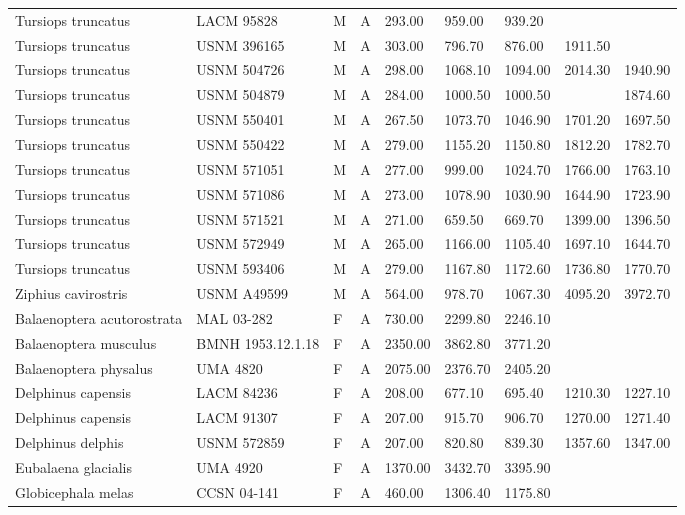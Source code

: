 \begin{longtable}{|p{1in}p{.8in}p{.25in}p{.25in}p{.5in}p{.5in}p{.5in}p{.5in}p{.55in}|}
  Tursiops truncatus & LACM 95828 & M & A & 293.00 & 959.00 & 939.20 &  &  \\ 
  Tursiops truncatus & USNM 396165 & M & A & 303.00 & 796.70 & 876.00 & 1911.50 &  \\ 
  Tursiops truncatus & USNM 504726 & M & A & 298.00 & 1068.10 & 1094.00 & 2014.30 & 1940.90 \\ 
  Tursiops truncatus & USNM 504879 & M & A & 284.00 & 1000.50 & 1000.50 &  & 1874.60 \\ 
  Tursiops truncatus & USNM 550401 & M & A & 267.50 & 1073.70 & 1046.90 & 1701.20 & 1697.50 \\ 
  Tursiops truncatus & USNM 550422 & M & A & 279.00 & 1155.20 & 1150.80 & 1812.20 & 1782.70 \\ 
  Tursiops truncatus & USNM 571051 & M & A & 277.00 & 999.00 & 1024.70 & 1766.00 & 1763.10 \\ 
  Tursiops truncatus & USNM 571086 & M & A & 273.00 & 1078.90 & 1030.90 & 1644.90 & 1723.90 \\ 
  Tursiops truncatus & USNM 571521 & M & A & 271.00 & 659.50 & 669.70 & 1399.00 & 1396.50 \\ 
   Tursiops truncatus & USNM 572949 & M & A & 265.00 & 1166.00 & 1105.40 & 1697.10 & 1644.70 \\ 
   Tursiops truncatus & USNM 593406 & M & A & 279.00 & 1167.80 & 1172.60 & 1736.80 & 1770.70 \\ 
   Ziphius cavirostris & USNM A49599 & M & A & 564.00 & 978.70 & 1067.30 & 4095.20 & 3972.70 \\ 
   Balaenoptera acutorostrata & MAL 03-282 & F & A & 730.00 & 2299.80 & 2246.10 &  &  \\ 
   Balaenoptera musculus & BMNH 1953.12.1.18 & F & A & 2350.00 & 3862.80 & 3771.20 &  &  \\ 
   Balaenoptera physalus & UMA 4820 & F & A & 2075.00 & 2376.70 & 2405.20 &  &  \\ 
   Delphinus capensis & LACM 84236 & F & A & 208.00 & 677.10 & 695.40 & 1210.30 & 1227.10 \\ 
   Delphinus capensis & LACM 91307 & F & A & 207.00 & 915.70 & 906.70 & 1270.00 & 1271.40 \\ 
   Delphinus delphis & USNM 572859 & F & A & 207.00 & 820.80 & 839.30 & 1357.60 & 1347.00 \\ 
   Eubalaena glacialis & UMA 4920 & F & A & 1370.00 & 3432.70 & 3395.90 &  &  \\ 
   Globicephala melas & CCSN 04-141 & F & A & 460.00 & 1306.40 & 1175.80 &  &  \\ 

\end{longtable}
